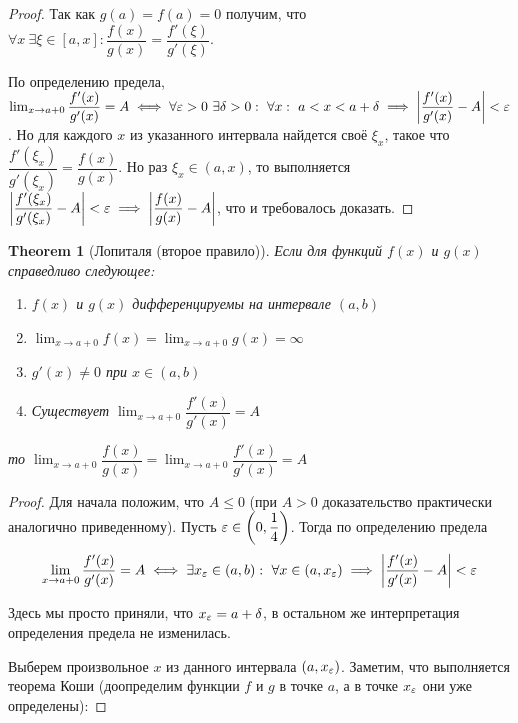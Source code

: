 \documentclass[a4paper]{article}
\theoremstyle{named}
\newtheorem*{namedtheorem}{Theorem}
\begin{document}
\begin{colloq}
\begin{proof}
			Так как $g(a) = f(a) = 0$ получим, что $\forall x \ \exists \xi \in [a, x]: \dfrac{f(x)}{g(x)} = \dfrac{f'(\xi)}{g'(\xi)}$.

			По определению предела, $\lim_{x \to a + 0} \dfrac{f'(x)}{g'(x)} = A \iff \forall \varepsilon > 0 \ \exists \delta > 0: \ \forall x: \ a < x < a + \delta \implies \left|\dfrac{f'(x)}{g'(x)} - A\right| < \varepsilon$. Но для каждого $x$ из указанного интервала найдется своё $\xi_x$, такое что $\dfrac{f'(\xi_x)}{g'(\xi_x)} = \dfrac{f(x)}{g(x)}$. Но раз $\xi_x \in (a, x)$, то выполняется $\left|\dfrac{f'(\xi_x)}{g'(\xi_x)} - A\right| < \varepsilon \implies \left|\dfrac{f(x)}{g(x)} - A\right|$, что и требовалось доказать.
		\end{proof}

		\begin{namedtheorem}[Лопиталя (второе правило)]
			Если для функций $f(x)$ и $g(x)$ справедливо следующее:

			\begin{enumerate}
				\item
				$f(x)$ и $g(x)$ дифференцируемы на интервале $(a, b)$

				\item
				$\lim_{x \to a + 0} f(x) = \lim_{x \to a + 0} g(x) = \infty$

				\item
				$g'(x) \neq 0$ при $x \in (a, b)$

				\item
				Существует $\lim_{x \to a + 0} \dfrac{f'(x)}{g'(x)} = A$
			\end{enumerate}

			то $\lim_{x \to a + 0} \dfrac{f(x)}{g(x)} = \lim_{x \to a + 0} \dfrac{f'(x)}{g'(x)} = A$
		\end{namedtheorem}

		\begin{proof}
			Для начала положим, что $A \leq 0$ (при $A > 0$ доказательство практически аналогично приведенному). Пусть $\varepsilon \in \left(0, \dfrac{1}{4}\right)$. Тогда по определению предела 
			\begin{equation*}
				\lim_{x \to a + 0} \dfrac{f'(x)}{g'(x)} = A \iff \exists x_{\eps} \in (a, b): \ \forall x \in (a, x_{\eps}) \implies \left|\dfrac{f'(x)}{g'(x)} - A\right| < \eps
			\end{equation*}

			Здесь мы просто приняли, что $x_{\varepsilon} = a + \delta$, в остальном же интерпретация определения предела не изменилась.

			Выберем произвольное $x$ из данного интервала $(a, x_{\varepsilon})$. Заметим, что выполняется теорема Коши (доопределим функции $f$ и $g$ в точке $a$, а в точке $x_{\varepsilon}$ они уже определены):


\end{proof}
\end{colloq}
\end{document}
